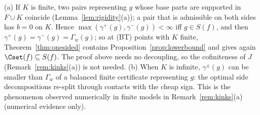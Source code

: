 \begin{remark}\label{rem:onesided}
(a) If $K$ is finite, two pairs representing $g$ whose base parts are
supported in $F\cup K$ coincide (Lemma~\ref{lem:rigidity}(a)); a pair that
is admissible on both sides has $b=0$ on $K$.  Hence
$\max(\gamma^+(g),\gamma^-(g))<\infty$ iff $g\in S(f)$, and then
$\gamma^+(g)=\gamma^-(g)=\Gamma_w(g)$; so at \textup{(BT)} points with $K$ finite,
Theorem~\ref{thm:onesided} contains Proposition~\ref{prop:lowerbound} and
gives again $\Cset(f)\subseteq S(f)$.  The
proof above needs no decoupling, so the cofiniteness of $J$
(Remark~\ref{rem:kinks}(a)) is not needed.
(b) When $K$ is infinite, $\gamma^\pm(g)$ can be smaller than $\Gamma_w$ of
a balanced finite certificate representing $g$: the optimal side
decompositions re-split through contacts with the cheap sign.  This is the
phenomenon observed numerically in finite models in
Remark~\ref{rem:kinks}(a) (numerical evidence only).
\end{remark}
